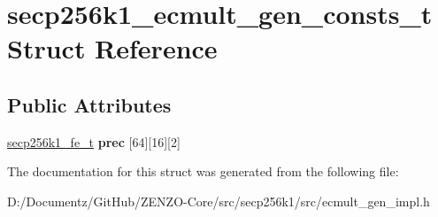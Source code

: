 \hypertarget{structsecp256k1__ecmult__gen__consts__t}{}\section{secp256k1\+\_\+ecmult\+\_\+gen\+\_\+consts\+\_\+t Struct Reference}
\label{structsecp256k1__ecmult__gen__consts__t}
\subsection*{Public Attributes}
\begin{DoxyCompactItemize}
\item 
\mbox{\label{structsecp256k1__ecmult__gen__consts__t_a38fa81fa38cafc25a77af91c7c904dc9}} 
\mbox{\hyperlink{structsecp256k1__fe__t}{secp256k1\+\_\+fe\+\_\+t}} {\bfseries prec} \mbox{[}64\mbox{]}\mbox{[}16\mbox{]}\mbox{[}2\mbox{]}
\end{DoxyCompactItemize}


The documentation for this struct was generated from the following file\+:\begin{DoxyCompactItemize}
\item 
D\+:/\+Documentz/\+Git\+Hub/\+Z\+E\+N\+Z\+O-\/\+Core/src/secp256k1/src/ecmult\+\_\+gen\+\_\+impl.\+h\end{DoxyCompactItemize}

